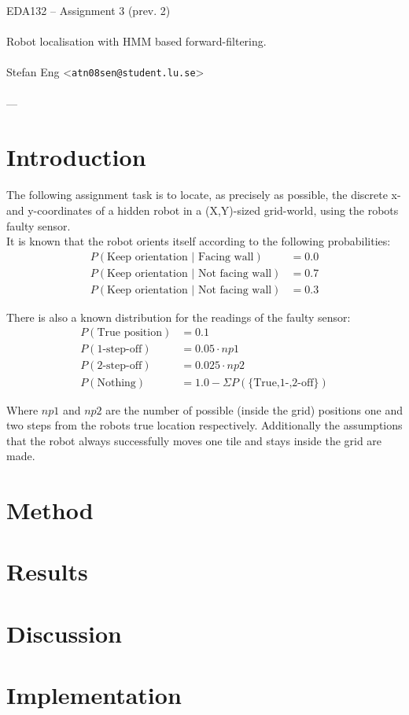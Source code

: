 \documentclass{article}
\begin{document}
  \begin{center}
    EDA132 -- Assignment 3 (prev. 2)\\
    \ \\
    {\Large Robot localisation with HMM based forward-filtering.} \\
    \ \\
    Stefan Eng <\texttt{atn08sen@student.lu.se}> \\
    \ \\
    ---
  \end{center}
  \vspace{-0.8cm}
  \section*{Introduction}

    The following assignment task is to locate, as precisely as possible, the
    discrete x- and y-coordinates of a hidden robot in a (X,Y)-sized
    grid-world, using the robots faulty sensor. \\

    It is known that the robot orients itself according to the following
    probabilities:
    \begin{align*}
      P(\textrm{Keep orientation | Facing wall}) &= 0.0 \\
      P(\textrm{Keep orientation | Not facing wall}) &= 0.7 \\
      P(\textrm{Keep orientation | Not facing wall}) &= 0.3
    \end{align*}

    There is also a known distribution for the readings of the faulty sensor:
    \begin{align*}
      P(\textrm{True position}) &= 0.1 \\
      P(\textrm{1-step-off}) &= 0.05 \cdot np1\\
      P(\textrm{2-step-off}) &= 0.025 \cdot np2\\
      P(\textrm{Nothing}) &= 1.0-\Sigma P(\textrm{\{True,1-,2-off\}})
    \end{align*}

    Where $np1$ and $np2$ are the number of possible (inside the grid)
    positions one and two steps from the robots true location respectively.
    Additionally the assumptions that the robot always successfully moves one
    tile and stays inside the grid are made.

  \section*{Method}
  \section*{Results}
  \section*{Discussion}
  \section*{Implementation}
\end{document}
